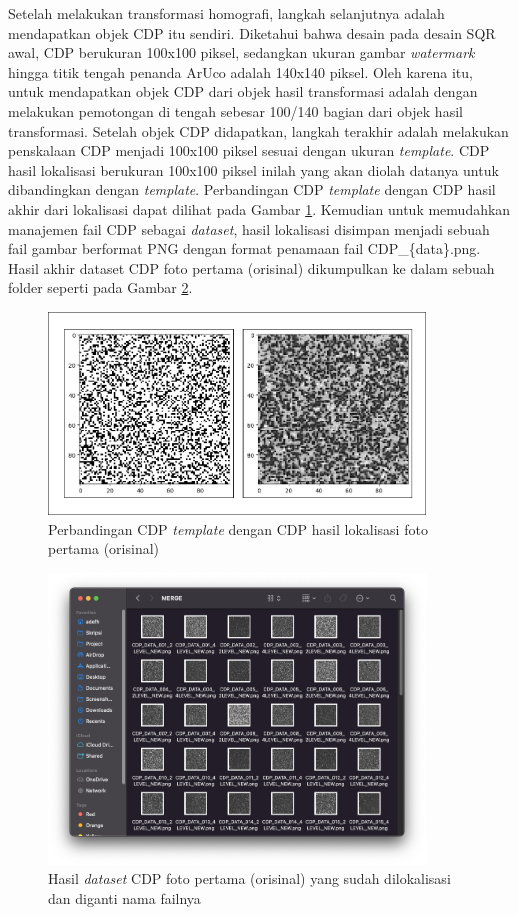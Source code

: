 Setelah melakukan transformasi homografi, langkah selanjutnya adalah mendapatkan objek CDP itu sendiri. Diketahui bahwa desain pada desain SQR awal, CDP
berukuran 100x100 piksel, sedangkan ukuran gambar \emph{watermark} hingga titik tengah penanda ArUco adalah 140x140 piksel. Oleh karena itu, untuk mendapatkan
objek CDP dari objek hasil transformasi adalah dengan melakukan pemotongan di tengah sebesar 100/140 bagian dari objek hasil transformasi. Setelah objek CDP
didapatkan, langkah terakhir adalah melakukan penskalaan CDP menjadi 100x100 piksel sesuai dengan ukuran \emph{template}. CDP hasil lokalisasi berukuran
100x100 piksel inilah yang akan diolah datanya untuk dibandingkan dengan \emph{template}. Perbandingan CDP \emph{template} dengan CDP hasil akhir dari
lokalisasi dapat dilihat pada Gambar \ref{Fig: 3-templatevslokalisasi}. Kemudian untuk memudahkan manajemen fail CDP sebagai \emph{dataset}, hasil lokalisasi
disimpan menjadi sebuah fail gambar berformat PNG dengan format penamaan fail CDP\_\{data\}.png. Hasil akhir dataset CDP foto pertama (orisinal) dikumpulkan ke
dalam sebuah folder seperti pada Gambar \ref{Fig: 3-hasildatasetcdp}.

\begin{figure}[h]
	\centering
	\includegraphics[width=10cm]{contents/chapter-3/3-templatevslokalisasi.png}
	\caption{Perbandingan CDP \emph{template} dengan CDP hasil lokalisasi foto pertama (orisinal)}
	\label{Fig: 3-templatevslokalisasi}
\end{figure}

\begin{figure}[h]
	\centering
	\includegraphics[width=10cm]{contents/chapter-3/3-hasildatasetcdp.png}
	\caption{Hasil \emph{dataset} CDP foto pertama (orisinal) yang sudah dilokalisasi dan diganti nama failnya}
	\label{Fig: 3-hasildatasetcdp}
\end{figure}


